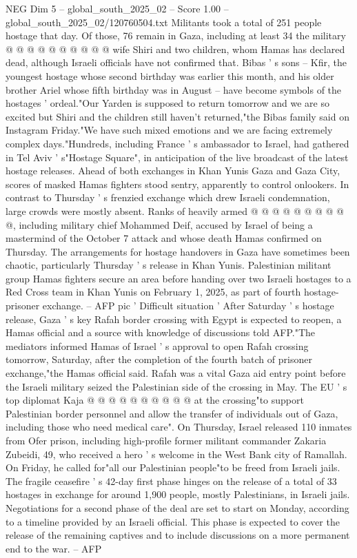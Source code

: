 \begin{textsample}{NEG Dim 5 – global\_south\_2025\_02 – Score 1.00 – global\_south\_2025\_02/120760504.txt}
Militants took a total of 251 people hostage that day.
Of those, 76 remain in Gaza, including at least 34 the military @ @ @ @ @ @ @ @ @ @ wife Shiri and two children, whom Hamas has declared dead, although Israeli officials have not confirmed that.
Bibas ' s sons -- Kfir, the youngest hostage whose second birthday was earlier this month, and his older brother Ariel whose fifth birthday was in August -- have become symbols of the hostages ' ordeal."Our Yarden is supposed to return tomorrow and we are so excited but Shiri and the children still haven't returned,"the Bibas family said on Instagram Friday."We have such mixed emotions and we are facing extremely complex days."Hundreds, including France ' s ambassador to Israel, had gathered in Tel Aviv ' s"Hostage Square", in anticipation of the live broadcast of the latest hostage releases.
Ahead of both exchanges in Khan Yunis Gaza and Gaza City, scores of masked Hamas fighters stood sentry, apparently to control onlookers.
In contrast to Thursday ' s frenzied exchange which drew Israeli condemnation, large crowds were mostly absent.
Ranks of heavily armed @ @ @ @ @ @ @ @ @ @, including military chief Mohammed Deif, accused by Israel of being a mastermind of the October 7 attack and whose death Hamas confirmed on Thursday.
The arrangements for hostage handovers in Gaza have sometimes been chaotic, particularly Thursday ' s release in Khan Yunis.
Palestinian militant group Hamas fighters secure an area before handing over two Israeli hostages to a Red Cross team in Khan Yunis on February 1, 2025, as part of fourth hostage-prisoner exchange. -- AFP pic ' Difficult situation ' After Saturday ' s hostage release, Gaza ' s key Rafah border crossing with Egypt is expected to reopen, a Hamas official and a source with knowledge of discussions told AFP."The mediators informed Hamas of Israel ' s approval to open Rafah crossing tomorrow, Saturday, after the completion of the fourth batch of prisoner exchange,"the Hamas official said.
Rafah was a vital Gaza aid entry point before the Israeli military seized the Palestinian side of the crossing in May.
The EU ' s top diplomat Kaja @ @ @ @ @ @ @ @ @ @ at the crossing"to support Palestinian border personnel and allow the transfer of individuals out of Gaza, including those who need medical care".
On Thursday, Israel released 110 inmates from Ofer prison, including high-profile former militant commander Zakaria Zubeidi, 49, who received a hero ' s welcome in the West Bank city of Ramallah.
On Friday, he called for"all our Palestinian people"to be freed from Israeli jails.
The fragile ceasefire ' s 42-day first phase hinges on the release of a total of 33 hostages in exchange for around 1,900 people, mostly Palestinians, in Israeli jails.
Negotiations for a second phase of the deal are set to start on Monday, according to a timeline provided by an Israeli official.
This phase is expected to cover the release of the remaining captives and to include discussions on a more permanent end to the war. -- AFP

\end{textsample}
